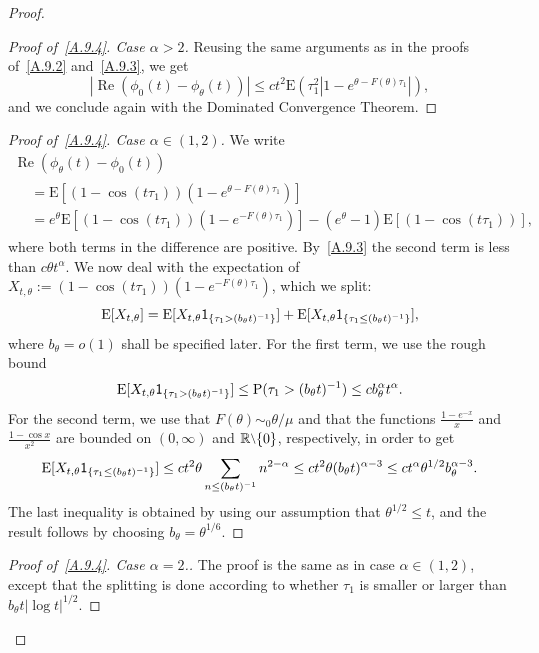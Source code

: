 \documentclass[11pt]{article}
\theoremstyle{definition}
\numberwithin{equation}{section}
\numberwithin{figure}{section}
\numberwithin{table}{section}
\DeclareMathOperator{\re}{Re}
\newcommand{\bbR}{{\ensuremath{\mathbb R}}}
\newcommand{\ga}{\alpha}
\newcommand{\gt}{\theta}
\newcommand\bP{\ensuremath{\mathrm{P}}}
\newcommand\bE{\ensuremath{\mathrm{E}}}
\newcommand{\ind}{{\sf 1}}
\newcommand{\sm}{{\raise0.3ex\hbox{$\scriptstyle \setminus$}}}
\newenvironment{step}[1]{\begin{proof}[#1]}{\let\qed\relax \end{proof}}
\newenvironment{laststep}[1]{\begin{proof}[#1]}{\end{proof}}
\begin{document}
\begin{proof}
\begin{step}{Proof of~\eqref{A.9.4}. Case $\ga >2$}
Reusing the same arguments as in the proofs of~\eqref{A.9.2} and~\eqref{A.9.3}, we get
\begin{equation}
| \re(\phi_0(t) -\phi_\gt(t)) | \le ct^2 \bE(\tau_1^2|1-e^{\gt - F(\gt)\tau_1}|),
\end{equation}
and we conclude again with the Dominated Convergence Theorem.
\end{step}

\begin{step}{Proof of~\eqref{A.9.4}. Case $\ga \in (1,2)$}
We write
\begin{multline}
\re (\phi_\gt(t) - \phi_0(t))\\
\begin{aligned}
&= \bE[(1-\cos(t\tau_1)) (1-e^{\gt -F(\gt)\tau_1})]\\
& = e^{\gt}\bE[(1-\cos(t\tau_1)) (1-e^{-F(\gt)\tau_1})] - (e^\gt - 1)\bE[(1-\cos(t\tau_1))],
\end{aligned}
\end{multline}
where both terms in the difference are positive. By~\eqref{A.9.3} the second term is less than $c\gt t^\ga$. We now deal with the expectation of $X_{t,\gt} := (1-\cos(t\tau_1)) (1-e^{-F(\gt)\tau_1})$, which we split:
\begin{equation}
\bE[X_{t,\gt}] = \bE[X_{t,\gt} \ind_{\{\tau_1 > (b_\gt t)^{-1}\}}] + \bE[X_{t,\gt} \ind_{\{\tau_1 \le (b_\gt t)^{-1}\}}],
\end{equation}
where $b_\gt = o(1)$ shall be specified later. For the first term, we use the rough bound
\begin{equation}
\bE[X_{t,\gt} \ind_{\{\tau_1 > (b_\gt t)^{-1}\}}] \le \bP(\tau_1 > (b_\gt t)^{-1}) \le c b_\gt^\ga t^\ga.
\end{equation}
For the second term, we use that $F(\theta)\sim_0 \gt/\mu$ and that the functions $\frac{1-e^{-x}}{x}$ and $\frac{1-\cos x}{x^2}$ are bounded on $(0,\infty)$ and $\bbR\sm\{0\}$, respectively, in order to get
\begin{equation}
\bE[X_{t,\gt} \ind_{\{\tau_1\le (b_\gt t)^{-1}\}}]
\le c t^2 \gt \sum_{n\le (b_\gt t)^{-1}} n^{2-\ga}
\le ct^2\gt (b_\gt t)^{\ga - 3} \le c t^\ga \gt^{1/2}b_\gt^{\ga-3}.
\end{equation}
The last inequality is obtained by using our assumption that $\gt^{1/2} \le t$, and the result follows by choosing $b_\gt = \gt^{1/6}$.
\end{step}

\begin{laststep}{Proof of~\eqref{A.9.4}. Case $\ga =2$.} The proof is the same as in case $\ga \in(1,2)$, except that the splitting is done according to whether $\tau_1$ is smaller or larger than $b_\gt t |{\log t}|^{1/2}$.
\end{laststep}
\let\qed\relax
\end{proof}
\end{document}
